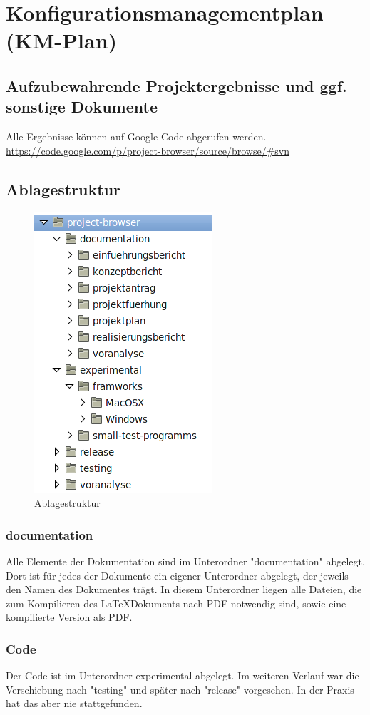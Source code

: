 \documentclass[10pt,paper=a4,final]{scrartcl}
\begin{document}
\section{Konfigurationsmanagementplan (KM-Plan)}
\subsection{Aufzubewahrende Projektergebnisse und ggf. sonstige Dokumente}
Alle Ergebnisse k\"onnen auf Google Code abgerufen werden. \url{https://code.google.com/p/project-browser/source/browse/#svn}
\subsection{Ablagestruktur}
\begin{figure}[h!]
\includegraphics[scale=0.6]{tree.png}
\caption{Ablagestruktur}
\end{figure}
\subsubsection{documentation}
Alle Elemente der Dokumentation sind im Unterordner "documentation" abgelegt. Dort ist f\"ur jedes der Dokumente ein eigener Unterordner abgelegt, der jeweils den Namen des Dokumentes tr\"agt. In diesem Unterordner liegen alle Dateien, die zum Kompilieren des \LaTeX Dokuments nach PDF notwendig sind, sowie eine kompilierte Version als PDF.
\subsubsection{Code}
Der Code ist im Unterordner experimental abgelegt. Im weiteren Verlauf war die Verschiebung nach "testing" und sp\"ater nach "release" vorgesehen. In der Praxis hat das aber nie stattgefunden.
\end{document}
